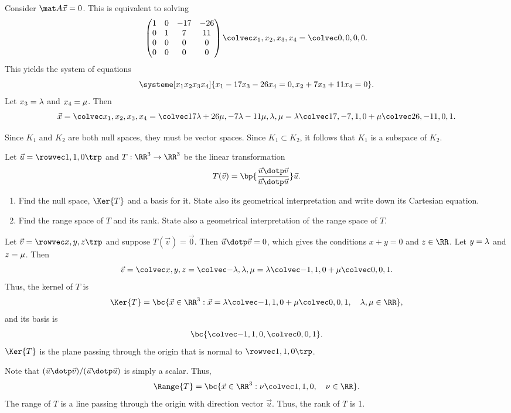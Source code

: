 \begin{solution}
\begin{ppart}
    \end{ppart}
    \begin{ppart}
        Consider $\mat A \vec x = 0$. This is equivalent to solving \[\begin{pmatrix}1 & 0 & -17 & -26 \\ 0 & 1 & 7 & 11 \\ 0 & 0 & 0 & 0 \\ 0 & 0 & 0 & 0\end{pmatrix} \cveciv{x_1}{x_2}{x_3}{x_4} = \cveciv0000.\] This yields the system of equations \[\systeme[x_1x_2x_3x_4]{x_1 - 17x_3 - 26x_4 = 0, x_2 + 7x_3 + 11x_4 = 0}.\] Let $x_3 = \lambda$ and $x_4 = \mu$. Then \[\vec x = \cveciv{x_1}{x_2}{x_3}{x_4} = \cveciv{17\l + 26\m}{-7\l - 11 \m}{\l}{\m} = \l \cveciv{17}{-7}{1}{0} + \m \cveciv{26}{-11}{0}{1}.\]

        Since $K_1$ and $K_2$ are both null spaces, they must be vector spaces. Since $K_1 \subset K_2$, it follows that $K_1$ is a subspace of $K_2$.
    \end{ppart}
\end{solution}

\begin{problem}
    Let $\vec u = \cveciiix110$ and $T : \RR^3 \to \RR^3$ be the linear transformation \[T(\vec v) = \bp{\frac{\vec u \dotp \vec v}{\vec u \dotp \vec u}} \vec u.\]

    \begin{enumerate}
        \item Find the null space, $\Ker{T}$ and a basis for it. State also its geometrical interpretation and write down its Cartesian equation.
        \item Find the range space of $T$ and its rank. State also a geometrical interpretation of the range space of $T$.
    \end{enumerate}
\end{problem}
\begin{solution}
    \begin{ppart}
        Let $\vec v = \cveciiix{x}{y}{z}$ and suppose $T(\vec v) = \vec 0$. Then $\vec u \dotp \vec v = 0$, which gives the conditions $x + y = 0$ and $z \in \RR$. Let $y = \lambda$ and $z = \mu$. Then \[\vec v = \cveciii{x}{y}{z} = \cveciii{-\l}{\l}{\m} = \l \cveciii{-1}{1}0 + \m \cveciii001.\] Thus, the kernel of $T$ is \[\Ker{T} = \bc{\vec x \in \RR^3 : \vec x = \l \cveciii{-1}{1}0 + \m \cveciii001, \quad \l, \m \in \RR},\] and its basis is \[\bc{\cveciii{-1}{1}{0}, \cveciii001}.\] $\Ker{T}$ is the plane passing through the origin that is normal to $\cveciiix{1}{1}{0}$. 
    \end{ppart}
    \begin{ppart}
        Note that $(\vec u \dotp \vec v)/(\vec u \dotp \vec u)$ is simply a scalar. Thus, \[\Range{T} = \bc{\vec x \in \RR^3 : \n \cveciii110, \quad \n \in \RR}.\] The range of $T$ is a line passing through the origin with direction vector $\vec u$. Thus, the rank of $T$ is 1. 
    \end{ppart}
\end{solution}

